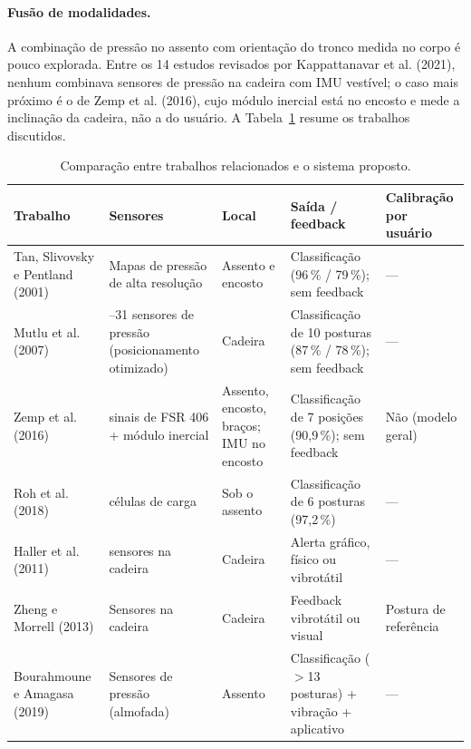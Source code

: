 \paragraph{Fusão de modalidades.} A combinação de pressão no assento com orientação
do tronco medida no corpo é pouco explorada. Entre os 14 estudos revisados por
Kappattanavar et al. (2021), nenhum combinava sensores de pressão na cadeira com
IMU vestível; o caso mais próximo é o de Zemp et al. (2016), cujo módulo inercial
está no encosto e mede a inclinação da cadeira, não a do usuário. A
Tabela~\ref{tab:rev-comparativo} resume os trabalhos discutidos.

\begin{table}[H]
\centering
\caption{Comparação entre trabalhos relacionados e o sistema proposto.}
\label{tab:rev-comparativo}
\begin{singlespace}
\footnotesize
\begin{tabularx}{\textwidth}{>{\raggedright\arraybackslash}p{2.7cm}
                             >{\raggedright\arraybackslash}X
                             >{\raggedright\arraybackslash}p{2.1cm}
                             >{\raggedright\arraybackslash}X
                             >{\raggedright\arraybackslash}p{2.0cm}}
\toprule
\textbf{Trabalho} & \textbf{Sensores} & \textbf{Local} &
\textbf{Saída / feedback} & \textbf{Calibração por usuário} \\
\midrule
Tan, Slivovsky e Pentland (2001) & Mapas de pressão de alta resolução &
  Assento e encosto & Classificação (96\,\% / 79\,\%); sem feedback & --- \\
Mutlu et al. (2007) & 19--31 sensores de pressão (posicionamento otimizado) &
  Cadeira & Classificação de 10 posturas (87\,\% / 78\,\%); sem feedback & --- \\
Zemp et al. (2016) & 16 sinais de FSR 406 + módulo inercial &
  Assento, encosto, braços; IMU no encosto & Classificação de 7 posições
  (90{,}9\,\%); sem feedback & Não (modelo geral) \\
Roh et al. (2018) & 4 células de carga & Sob o assento &
  Classificação de 6 posturas (97{,}2\,\%) & --- \\
Haller et al. (2011) & 4 sensores na cadeira & Cadeira &
  Alerta gráfico, físico ou vibrotátil & --- \\
Zheng e Morrell (2013) & Sensores na cadeira & Cadeira &
  Feedback vibrotátil ou visual & Postura de referência \\
Bourahmoune e Amagasa (2019) & Sensores de pressão (almofada) &
  Assento & Classificação ($>$13 posturas) + vibração + aplicativo & --- \\

\end{tabularx}
\end{singlespace}
\end{table}
